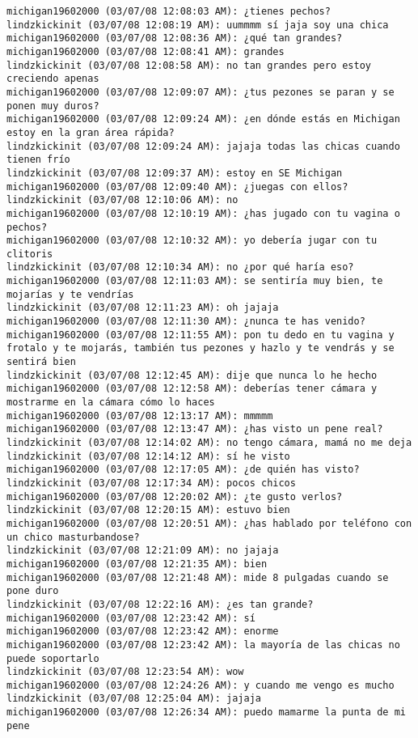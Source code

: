 \begin{verbatim}
michigan19602000 (03/07/08 12:08:03 AM): ¿tienes pechos?
lindzkickinit (03/07/08 12:08:19 AM): uummmm sí jaja soy una chica
michigan19602000 (03/07/08 12:08:36 AM): ¿qué tan grandes?
michigan19602000 (03/07/08 12:08:41 AM): grandes
lindzkickinit (03/07/08 12:08:58 AM): no tan grandes pero estoy creciendo apenas
michigan19602000 (03/07/08 12:09:07 AM): ¿tus pezones se paran y se ponen muy duros?
michigan19602000 (03/07/08 12:09:24 AM): ¿en dónde estás en Michigan estoy en la gran área rápida?
lindzkickinit (03/07/08 12:09:24 AM): jajaja todas las chicas cuando tienen frío
lindzkickinit (03/07/08 12:09:37 AM): estoy en SE Michigan
michigan19602000 (03/07/08 12:09:40 AM): ¿juegas con ellos?
lindzkickinit (03/07/08 12:10:06 AM): no
michigan19602000 (03/07/08 12:10:19 AM): ¿has jugado con tu vagina o pechos?
michigan19602000 (03/07/08 12:10:32 AM): yo debería jugar con tu clitoris
lindzkickinit (03/07/08 12:10:34 AM): no ¿por qué haría eso?
michigan19602000 (03/07/08 12:11:03 AM): se sentiría muy bien, te mojarías y te vendrías
lindzkickinit (03/07/08 12:11:23 AM): oh jajaja
michigan19602000 (03/07/08 12:11:30 AM): ¿nunca te has venido?
michigan19602000 (03/07/08 12:11:55 AM): pon tu dedo en tu vagina y frotalo y te mojarás, también tus pezones y hazlo y te vendrás y se sentirá bien
lindzkickinit (03/07/08 12:12:45 AM): dije que nunca lo he hecho
michigan19602000 (03/07/08 12:12:58 AM): deberías tener cámara y mostrarme en la cámara cómo lo haces
michigan19602000 (03/07/08 12:13:17 AM): mmmmm
michigan19602000 (03/07/08 12:13:47 AM): ¿has visto un pene real?
lindzkickinit (03/07/08 12:14:02 AM): no tengo cámara, mamá no me deja
lindzkickinit (03/07/08 12:14:12 AM): sí he visto
michigan19602000 (03/07/08 12:17:05 AM): ¿de quién has visto?
lindzkickinit (03/07/08 12:17:34 AM): pocos chicos
michigan19602000 (03/07/08 12:20:02 AM): ¿te gusto verlos?
lindzkickinit (03/07/08 12:20:15 AM): estuvo bien
michigan19602000 (03/07/08 12:20:51 AM): ¿has hablado por teléfono con un chico masturbandose?
lindzkickinit (03/07/08 12:21:09 AM): no jajaja
michigan19602000 (03/07/08 12:21:35 AM): bien
michigan19602000 (03/07/08 12:21:48 AM): mide 8 pulgadas cuando se pone duro
lindzkickinit (03/07/08 12:22:16 AM): ¿es tan grande?
michigan19602000 (03/07/08 12:23:42 AM): sí
michigan19602000 (03/07/08 12:23:42 AM): enorme
michigan19602000 (03/07/08 12:23:42 AM): la mayoría de las chicas no puede soportarlo
lindzkickinit (03/07/08 12:23:54 AM): wow
michigan19602000 (03/07/08 12:24:26 AM): y cuando me vengo es mucho
lindzkickinit (03/07/08 12:25:04 AM): jajaja
michigan19602000 (03/07/08 12:26:34 AM): puedo mamarme la punta de mi pene

\end{verbatim}
